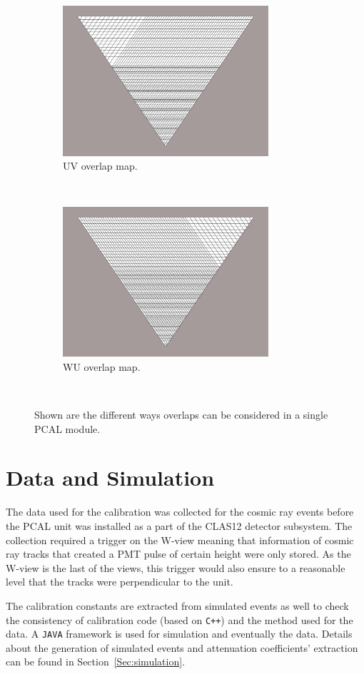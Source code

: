 \begin{figure}[h]
  \begin{subfigure}[b]{0.45\textwidth}
  \includegraphics[width= 3in, keepaspectratio = true]{PCAL_UV_screenshot}
  \caption{UV overlap map.}
 \end{subfigure}
  ~
  \begin{subfigure}[b]{0.45\textwidth}
  \includegraphics[width= 3in, keepaspectratio = true]{PCAL_WU_screenshot}
  \caption{WU overlap map.}
  \end{subfigure}
  ~
  \caption{Shown are the different ways overlaps can be considered in a single PCAL module.}
  \label{fig:PCAL_overlap}
\end{figure}
\FloatBarrier

\section{Data and Simulation}
The data used for the calibration was collected for the cosmic ray events before the PCAL unit was installed as a part of the CLAS12
detector subsystem. The collection required a trigger on the W-view meaning that information of cosmic ray tracks that created a PMT pulse of certain 
height were only stored. As the W-view is the last of the views, this trigger would also ensure to a reasonable level that the tracks
were perpendicular to the unit.

The calibration constants are extracted from simulated events as well to check the consistency of calibration code (based on \texttt{C++})
and the method used for the data. A \texttt{JAVA} framework is used for simulation and eventually the data. Details about the generation of 
simulated events and attenuation coefficients' extraction can be found in Section~\ref{Sec:simulation}.
\clearpage
